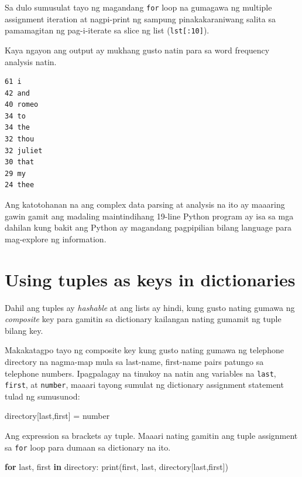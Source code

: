 \documentclass[10pt,]{book}
\newenvironment{Shaded}{}{}
\newcommand{\BuiltInTok}[1]{\textcolor[rgb]{0.00,0.50,0.00}{#1}}
\newcommand{\ControlFlowTok}[1]{\textcolor[rgb]{0.00,0.44,0.13}{\textbf{#1}}}
\newcommand{\KeywordTok}[1]{\textcolor[rgb]{0.00,0.44,0.13}{\textbf{#1}}}
\newcommand{\NormalTok}[1]{#1}
\newcommand{\OperatorTok}[1]{\textcolor[rgb]{0.40,0.40,0.40}{#1}}
\begin{document}
Sa dulo sumusulat tayo ng magandang \texttt{for} loop na gumagawa ng
multiple assignment iteration at nagpi-print ng sampung pinakakaraniwang
salita sa pamamagitan ng pag-i-iterate sa slice ng list
(\texttt{lst{[}:10{]}}).

Kaya ngayon ang output ay mukhang gusto natin para sa word frequency
analysis natin.

{\small
\begin{verbatim}
61 i
42 and
40 romeo
34 to
34 the
32 thou
32 juliet
30 that
29 my
24 thee
\end{verbatim}
}

Ang katotohanan na ang complex data parsing at analysis na ito ay
maaaring gawin gamit ang madaling maintindihang 19-line Python program
ay isa sa mga dahilan kung bakit ang Python ay magandang pagpipilian
bilang language para mag-explore ng information.

\section{Using tuples as keys in
dictionaries}\label{using-tuples-as-keys-in-dictionaries}

 

Dahil ang tuples ay \emph{hashable} at ang lists ay hindi, kung gusto
nating gumawa ng \emph{composite} key para gamitin sa dictionary
kailangan nating gumamit ng tuple bilang key.

Makakatagpo tayo ng composite key kung gusto nating gumawa ng telephone
directory na nagma-map mula sa last-name, first-name pairs patungo sa
telephone numbers. Ipagpalagay na tinukoy na natin ang variables na
\texttt{last}, \texttt{first}, at \texttt{number}, maaari tayong sumulat
ng dictionary assignment statement tulad ng sumusunod:

\begin{Shaded}
\begin{Highlighting}[]
\NormalTok{directory[last,first] }\OperatorTok{=}\NormalTok{ number}
\end{Highlighting}
\end{Shaded}

Ang expression sa brackets ay tuple. Maaari nating gamitin ang tuple
assignment sa \texttt{for} loop para dumaan sa dictionary na ito.


\begin{Shaded}
\begin{Highlighting}[]
\ControlFlowTok{for}\NormalTok{ last, first }\KeywordTok{in}\NormalTok{ directory:}
    \BuiltInTok{print}\NormalTok{(first, last, directory[last,first])}
\end{Highlighting}
\end{Shaded}
\end{document}
